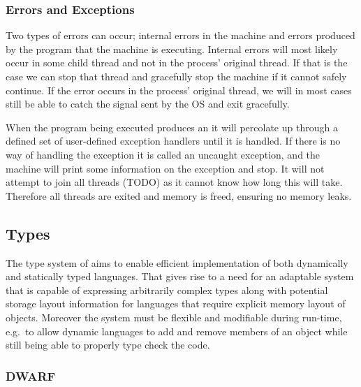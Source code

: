 \subsubsection{Errors and Exceptions}

Two types of errors can occur; internal errors in the machine and errors
produced by the program that the machine is executing. Internal errors will most
likely occur in some child thread and not in the process' original thread. If
that is the case we can stop that thread and gracefully stop the machine if it
cannot safely continue. If the error occurs in the process' original thread, we
will in most cases still be able to catch the signal sent by the OS and exit
gracefully.

When the program being executed produces an  it will percolate
up through a defined set of user-defined exception handlers until it is
handled. If there is no way of handling the exception it is called an uncaught
exception, and the machine will print some information on the exception and
stop. It will not attempt to join all threads (TODO) as it cannot know how long
this will take. Therefore all threads are exited and memory is freed, ensuring
no memory leaks.

\subsection{Types}
\label{sec:design:types}

The type system of \thename{} aims to enable efficient implementation of both
dynamically and statically typed languages. That gives rise to a need for an
adaptable system that is capable of expressing arbitrarily complex types along
with potential storage layout information for languages that require explicit
memory layout of objects. Moreover the system must be flexible and modifiable
during run-time, e.g.~to allow dynamic languages to add and remove members of an
object while still being able to properly type check the code.

\subsubsection{DWARF}
\label{sec:design:types:dwarf}

